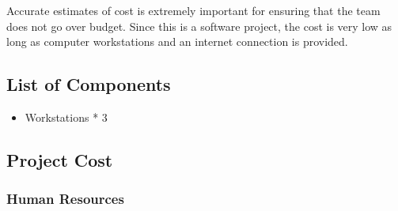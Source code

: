 Accurate estimates of cost is extremely important for ensuring that the team
does not go over budget. Since this is a software project, the cost is very low
as long as computer workstations and an internet connection is provided.
\subsection{List of Components}
\begin{itemize}
\item Workstations * 3
\end{itemize}
\subsection{Project Cost}
\subsubsection{Human Resources}
